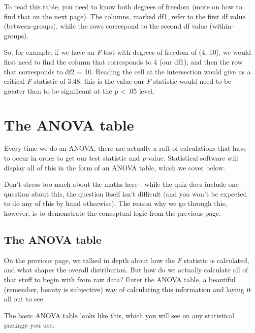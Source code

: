\documentclass[
]{book}
\begin{document}
To read this table, you need to know both degrees of freedom (more on
how to find that on the next page). The columns, marked df1, refer to
the first df value (between-groups), while the rows correspond to the
second df value (within-groups).

So, for example, if we have an \emph{F}-test with degrees of freedom of (4,
10), we would first need to find the column that corresponds to 4 (our
df1), and then the row that corresponds to df2 = 10. Reading the cell at
the intersection would give us a critical \emph{F}-statistic of 3.48; this is
the value our \emph{F}-statistic would need to be greater than to be
significant at the p \textless{} .05 level.

\section{The ANOVA table}\label{the-anova-table}

Every time we do an ANOVA, there are actually a raft of calculations
that have to occur in order to get our test statistic and \emph{p}-value.
Statistical software will display all of this in the form of an ANOVA
table, which we cover below.

Don't stress too much about the maths here - while the quiz does include
one question about this, the question itself isn't difficult (and you
won't be expected to do any of this by hand otherwise). The reason why
we go through this, however, is to demonstrate the conceptual logic from
the previous page.

\subsection{The ANOVA table}\label{the-anova-table-1}

On the previous page, we talked in depth about how the \emph{F} statistic is
calculated, and what shapes the overall distribution. But how do we
actually calculate all of that stuff to begin with from raw data? Enter
the ANOVA table, a beautiful (remember, beauty is subjective) way of
calculating this information and laying it all out to see.

The basic ANOVA table looks like this, which you will see on any
statistical package you use.
\end{document}
